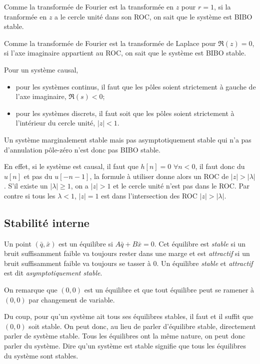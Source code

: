 Comme la transformée de Fourier
est la transformée en $z$ pour $r = 1$,
si la tranformée en $z$ a le cercle unité dans son ROC, on sait
que le système est BIBO stable.

Comme la transformée de Fourier est la transformée de Laplace pour $\Re(z) = 0$,
si l'axe imaginaire appartient au ROC, on sait
que le système est BIBO stable.

Pour un système causal,
\begin{itemize}
  \item pour les systèmes continus, il faut que les pôles soient
    strictement à gauche de l'axe imaginaire, $\Re(s) < 0$;
  \item pour les systèmes discrets, il faut soit que les pôles soient
    strictement à l'intérieur du cercle unité, $|z| < 1$.
\end{itemize}
Un système marginalement stable mais pas asymptotiquement stable
qui n'a pas d'annulation pôle-zéro n'est donc pas BIBO stable.

En effet, si le système est causal, il faut que $h[n] = 0$ $\forall n < 0$,
il faut donc du $u[n]$ et pas du $u[-n-1]$, la formule à utiliser donne
alors un ROC de $|z| > |\lambda|$.
S'il existe un $|\lambda| \geq 1$,
on a $|z| > 1$ et le cercle unité n'est pas
dans le ROC.
Par contre si tous les $\lambda < 1$, $|z| = 1$ est dans l'intersection
des ROC $|z| > |\lambda|$.

\subsection{Stabilité interne}
Un point $(\bar{q}, \bar{x})$ est un équilibre si $A\bar{q} + B\bar{x} = 0$.
Cet équilibre est \emph{stable} si un bruit suffisamment faible
va toujours rester dans une marge et est \emph{attractif} si
un bruit suffisamment faible va toujours se tasser à 0.
Un équilibre \emph{stable} et \emph{attractif}
est dit \emph{asymptotiquement stable}.

On remarque que $(0,0)$ est un équilibre et que tout équilibre peut se
ramener à $(0,0)$ par changement de variable.

Du coup, pour qu'un système ait tous ses équilibres stables,
il faut et il suffit que $(0,0)$ soit stable.
On peut donc, au lieu de parler d'équilibre stable,
directement parler de système stable.
Tous les équilibres ont la même nature,
on peut donc parler du système.
Dire qu'un système est stable
signifie que tous les équilibres du système sont stables.

